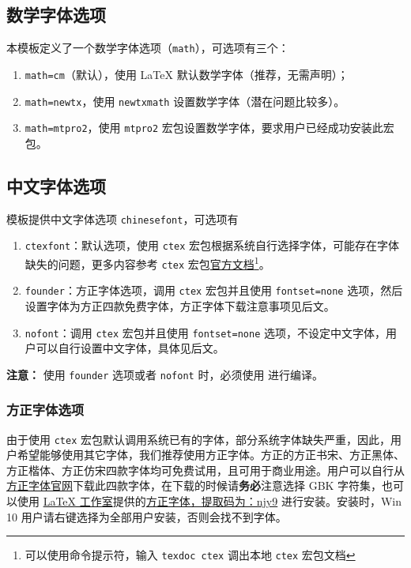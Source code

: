 \documentclass[cn,hazy,blue,14pt,screen]{elegantnote}
\begin{document}
\subsection{数学字体选项}

本模板定义了一个数学字体选项（\lstinline{math}），可选项有三个：
\begin{enumerate}
  \item \lstinline{math=cm}（默认），使用 \LaTeX{} 默认数学字体（推荐，无需声明）；
  \item \lstinline{math=newtx}，使用 \lstinline{newtxmath} 设置数学字体（潜在问题比较多）。
  \item \lstinline{math=mtpro2}，使用 \lstinline{mtpro2} 宏包设置数学字体，要求用户已经成功安装此宏包。
\end{enumerate}


\subsection{中文字体选项}
模板提供中文字体选项 \lstinline{chinesefont}，可选项有
\begin{enumerate}
\item \lstinline{ctexfont}：默认选项，使用 \lstinline{ctex} 宏包根据系统自行选择字体，可能存在字体缺失的问题，更多内容参考 \lstinline{ctex} 宏包\href{https://ctan.org/pkg/ctex}{官方文档}\footnote{可以使用命令提示符，输入 \lstinline{texdoc ctex} 调出本地 \lstinline{ctex} 宏包文档}。
\item \lstinline{founder}：方正字体选项，调用 \lstinline{ctex} 宏包并且使用 \lstinline{fontset=none} 选项，然后设置字体为方正四款免费字体，方正字体下载注意事项见后文。
\item \lstinline{nofont}：调用 \lstinline{ctex} 宏包并且使用 \lstinline{fontset=none} 选项，不设定中文字体，用户可以自行设置中文字体，具体见后文。
\end{enumerate}

\noindent \textbf{注意：} 使用 \lstinline{founder} 选项或者 \lstinline{nofont} 时，必须使用  进行编译。

\subsubsection{方正字体选项}
由于使用 \lstinline{ctex} 宏包默认调用系统已有的字体，部分系统字体缺失严重，因此，用户希望能够使用其它字体，我们推荐使用方正字体。方正的{\songti 方正书宋}、{\heiti 方正黑体}、{\kaishu 方正楷体}、{\fangsong 方正仿宋}四款字体均可免费试用，且可用于商业用途。用户可以自行从\href{http://www.foundertype.com/}{方正字体官网}下载此四款字体，在下载的时候请\textbf{务必}注意选择 GBK 字符集，也可以使用 \href{https://www.latexstudio.net/}{\LaTeX{} 工作室}提供的\href{https://pan.baidu.com/s/1BgbQM7LoinY7m8yeP25Y7Q}{方正字体，提取码为：njy9} 进行安装。安装时，{\kaishu Win 10 用户请右键选择为全部用户安装，否则会找不到字体。}
\end{document}
